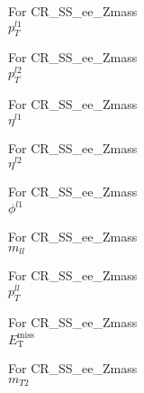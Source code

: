 \begin{frame}{For CR\_SS\_ee\_Zmass \\ $p_T^{l1}$}
\end{frame}

\begin{frame}{For CR\_SS\_ee\_Zmass \\ $p_T^{l2}$}
\end{frame}

\begin{frame}{For CR\_SS\_ee\_Zmass \\ $\eta^{l1}$}
\end{frame}

\begin{frame}{For CR\_SS\_ee\_Zmass \\ $\eta^{l2}$}
\end{frame}

\begin{frame}{For CR\_SS\_ee\_Zmass \\ $\phi^{l1}$}
\end{frame}

\begin{frame}{For CR\_SS\_ee\_Zmass \\ $m_{ll}$}
\end{frame}

\begin{frame}{For CR\_SS\_ee\_Zmass \\ $p_T^{ll}$}
\end{frame}

\begin{frame}{For CR\_SS\_ee\_Zmass \\ $E_{\text{T}}^{\text{miss}}$}
\end{frame}

\begin{frame}{For CR\_SS\_ee\_Zmass \\ $m_{T2}$}
\end{frame}

